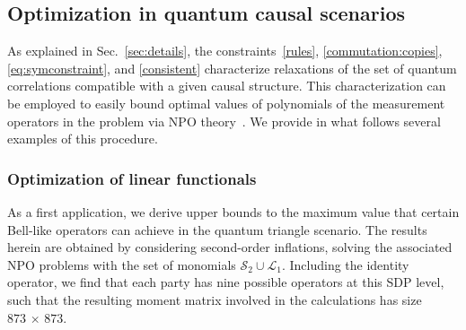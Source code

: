 \documentclass[superscriptaddress,aps,prx,nofootinbib,twocolumn,twoside,reprint,letterpaper,longbibliography]{revtex4-2}
\begin{document}
\subsection{Optimization in quantum causal scenarios}\label{sec:opt}
As explained in Sec.~\ref{sec:details}, the constraints~\eqref{rules}, \eqref{commutation:copies}, \eqref{eq:symconstraint}, and \eqref{consistent} characterize relaxations of the set of quantum correlations compatible with a given causal structure.
This characterization can be employed to easily bound optimal values of polynomials of the measurement operators in the problem via NPO theory~\cite{npo}.
We provide in what follows several examples of this procedure.

\subsubsection{Optimization of linear functionals}\label{sec:results:optim:linear}
As a first application, we derive upper bounds to the maximum value that certain Bell-like operators can achieve in the quantum triangle scenario.
The results herein are obtained by considering second-order inflations, solving the associated NPO problems with the set of monomials $\mathcal{S}_2\cup\mathcal{L}_1$.
Including the identity operator, we find that each party has nine possible operators at this SDP level, such that the resulting moment matrix involved in the calculations has size $873\,{\times}\,873$.
\end{document}
